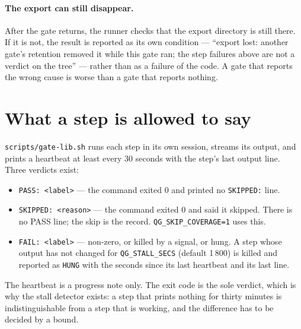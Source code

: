 \paragraph{The export can still disappear.} After the gate returns, the runner checks that the
export directory is still there. If it is not, the result is reported as its own condition ---
``export lost: another gate's retention removed it while this gate ran; the step failures
above are not a verdict on the tree'' --- rather than as a failure of the code. A gate that
reports the wrong cause is worse than a gate that reports nothing.

\section{What a step is allowed to say}

\texttt{scripts/gate-lib.sh} runs each step in its own session, streams its output, and prints
a heartbeat at least every 30 seconds with the step's last output line. Three verdicts exist:

\begin{itemize}
	\item \texttt{PASS: <label>} --- the command exited 0 and printed no \texttt{SKIPPED:}
	line.
	\item \texttt{SKIPPED: <reason>} --- the command exited 0 and said it skipped. There is no
	PASS line; the skip is the record. \texttt{QG\_SKIP\_COVERAGE=1} uses this.
	\item \texttt{FAIL: <label>} --- non-zero, or killed by a signal, or hung. A step whose
	output has not changed for \texttt{QG\_STALL\_SECS} (default 1\,800) is killed and reported
	as \texttt{HUNG} with the seconds since its last heartbeat and its last line.
\end{itemize}

The heartbeat is a progress note only. The exit code is the sole verdict, which is why the
stall detector exists: a step that prints nothing for thirty minutes is indistinguishable from
a step that is working, and the difference has to be decided by a bound.

